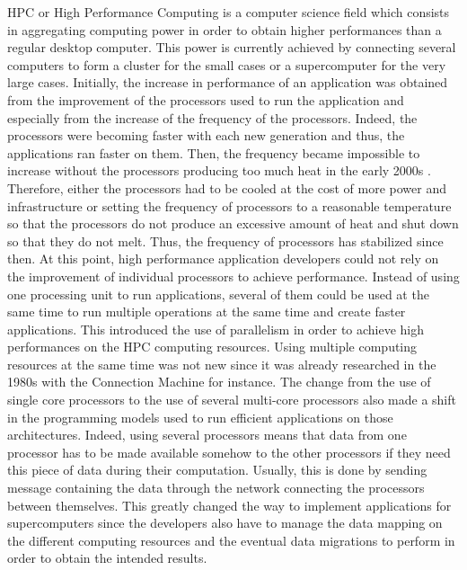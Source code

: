 HPC or High Performance Computing is a computer science field which consists in aggregating computing power in order to obtain higher performances than a regular desktop computer.
This power is currently achieved by connecting several computers to form a cluster for the small cases or a supercomputer for the very large cases.
Initially, the increase in performance of an application was obtained from the improvement of the processors used to run the application and especially from the increase of the frequency of the processors.
Indeed, the processors were becoming faster with each new generation and thus, the applications ran faster on them.
Then, the frequency became impossible to increase without the processors producing too much heat in the early 2000s \cite{KirkH2010}.
Therefore, either the processors had to be cooled at the cost of more power and infrastructure or setting the frequency of processors to a reasonable temperature so that the processors do not produce an excessive amount of heat and shut down so that they do not melt.
Thus, the frequency of processors has stabilized since then.
At this point, high performance application developers could not rely on the improvement of individual processors to achieve performance.
Instead of using one processing unit to run applications, several of them could be used at the same time to run multiple operations at the same time and create faster applications.
This introduced the use of parallelism in order to achieve high performances on the HPC computing resources.
Using multiple computing resources at the same time was not new since it was already researched in the 1980s with the Connection Machine \cite{Hilli1989phd} for instance.
The change from the use of single core processors to the use of several multi-core processors also made a shift in the programming models used to run efficient applications on those architectures.
Indeed, using several processors means that data from one processor has to be made available somehow to the other processors if they need this piece of data during their computation.
Usually, this is done by sending message containing the data through the network connecting the processors between themselves.
This greatly changed the way to implement applications for supercomputers since the developers also have to manage the data mapping on the different computing resources and the eventual data migrations to perform in order to obtain the intended results.

